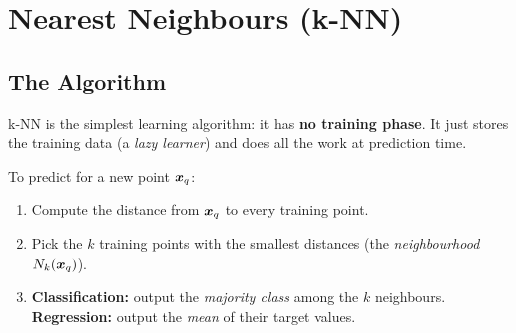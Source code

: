 \section{Nearest Neighbours (k-NN)}

\subsection{The Algorithm}

k-NN is the simplest learning algorithm: it has \textbf{no training phase}. It just stores the training data (a \emph{lazy learner}) and does all the work at prediction time.

\begin{definition}
To predict for a new point $\boldsymbol{x}_q$:
\begin{enumerate}
  \item Compute the distance from $\boldsymbol{x}_q$ to every training point.
  \item Pick the $k$ training points with the smallest distances (the \emph{neighbourhood} $N_k(\boldsymbol{x}_q)$).
  \item \textbf{Classification:} output the \emph{majority class} among the $k$ neighbours.\\
        \textbf{Regression:} output the \emph{mean} of their target values.
\end{enumerate}
\end{definition}

